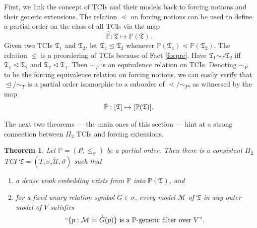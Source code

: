 \documentclass[12pt, twoside]{memoir}
\numberwithin{equation}{section}
\newtheorem{thm}{Theorem}[section]
\theoremstyle{definition}
\theoremstyle{remark}
\theoremstyle{definition}
\theoremstyle{definition}
\theoremstyle{definition}
\theoremstyle{remark}
\begin{document}
First, we link the concept of TCIs and their models back to forcing notions and their generic extensions. The relation $\lessdot$ on forcing notions can be used to define a partial order on the class of all TCIs via the map 
\begin{equation}\label{pmap}
    \hat{\mathbb{P}} : \mathfrak{T} \mapsto \mathbb{P}(\mathfrak{T}) \text{.}
\end{equation}
Given two TCIs $\mathfrak{T}_1$ and $\mathfrak{T}_2$, let $\mathfrak{T}_1 \trianglelefteq \mathfrak{T}_2$ whenever $\mathbb{P}(\mathfrak{T}_1) \lessdot \mathbb{P}(\mathfrak{T}_2)$. The relation $\trianglelefteq$ is a preordering of TCIs because of Fact \ref{forpre}. Have $\mathfrak{T}_1 \sim_T \mathfrak{T}_2$ iff $\mathfrak{T}_1 \trianglelefteq \mathfrak{T}_2$ and $\mathfrak{T}_2 \trianglelefteq \mathfrak{T}_1$. Then $\sim_T$ is an equivalence relation on TCIs. Denoting $\sim_P$ to be the forcing equivalence relation on forcing notions, we can easily verify that $\trianglelefteq / \sim_T$ is a partial order isomorphic to a suborder of $\lessdot / \sim_P$, as witnessed by the map 
\begin{equation}\label{peqmap}
    \Tilde{\mathbb{P}}: [\mathfrak{T}] \mapsto [\mathbb{P}(\mathfrak{T})] \text{.}
\end{equation}

The next two theorems --- the main ones of this section --- hint at a strong connection between $\Pi_2$ TCIs and forcing extensions.

\begin{thm}\label{revgenmodels}
Let $\mathbb{P} = (P, \leq_{\mathbb{P}})$ be a partial order. Then there is a consistent $\Pi_2$ TCI $\mathfrak{T} = (T, \sigma, \dot{\mathcal{U}}, \vartheta)$ such that
\begin{enumerate}[label=(\alph*)]
    \item a dense weak embedding exists from $\mathbb{P}$ into $\mathbb{P}(\mathfrak{T})$, and
    \item for a fixed unary relation symbol $\dot{G} \in \sigma$, every model $\mathcal{M}$ of $\mathfrak{T}$ in any outer model of $V$ satisfies $$``\{p : \mathcal{M} \models \dot{G}(p)\} \text{ is a } \mathbb{P} \text{-generic filter over } V" \text{.}$$
\end{enumerate}
\end{thm}
\end{document}
